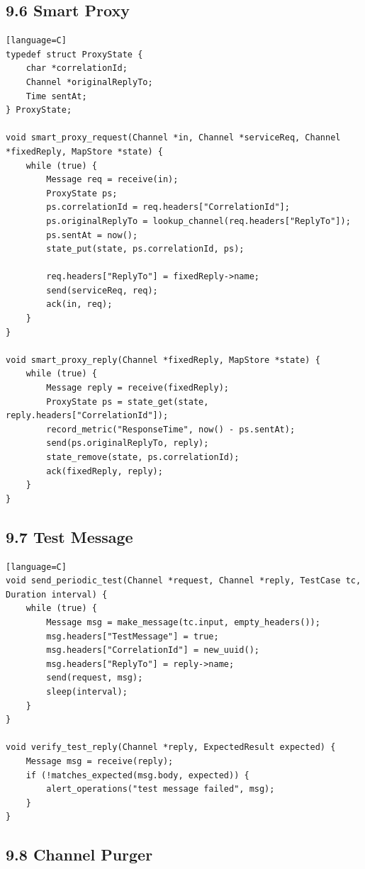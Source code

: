\documentclass[11pt]{article}
\begin{document}
\subsection{9.6 Smart Proxy}\label{smart-proxy}

\begin{verbatim}[language=C]
typedef struct ProxyState {
    char *correlationId;
    Channel *originalReplyTo;
    Time sentAt;
} ProxyState;

void smart_proxy_request(Channel *in, Channel *serviceReq, Channel *fixedReply, MapStore *state) {
    while (true) {
        Message req = receive(in);
        ProxyState ps;
        ps.correlationId = req.headers["CorrelationId"];
        ps.originalReplyTo = lookup_channel(req.headers["ReplyTo"]);
        ps.sentAt = now();
        state_put(state, ps.correlationId, ps);

        req.headers["ReplyTo"] = fixedReply->name;
        send(serviceReq, req);
        ack(in, req);
    }
}

void smart_proxy_reply(Channel *fixedReply, MapStore *state) {
    while (true) {
        Message reply = receive(fixedReply);
        ProxyState ps = state_get(state, reply.headers["CorrelationId"]);
        record_metric("ResponseTime", now() - ps.sentAt);
        send(ps.originalReplyTo, reply);
        state_remove(state, ps.correlationId);
        ack(fixedReply, reply);
    }
}
\end{verbatim}

\subsection{9.7 Test Message}\label{test-message}

\begin{verbatim}[language=C]
void send_periodic_test(Channel *request, Channel *reply, TestCase tc, Duration interval) {
    while (true) {
        Message msg = make_message(tc.input, empty_headers());
        msg.headers["TestMessage"] = true;
        msg.headers["CorrelationId"] = new_uuid();
        msg.headers["ReplyTo"] = reply->name;
        send(request, msg);
        sleep(interval);
    }
}

void verify_test_reply(Channel *reply, ExpectedResult expected) {
    Message msg = receive(reply);
    if (!matches_expected(msg.body, expected)) {
        alert_operations("test message failed", msg);
    }
}
\end{verbatim}

\subsection{9.8 Channel Purger}\label{channel-purger}
\end{document}
